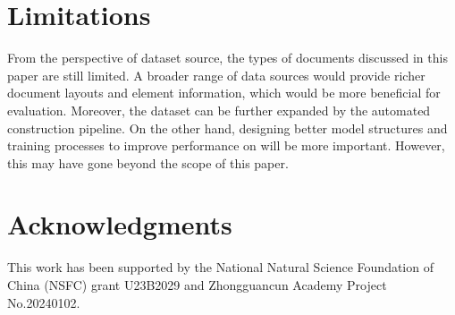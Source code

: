 \section*{Limitations}
From the perspective of dataset source, the types of documents discussed in this paper are still limited. A broader range of data sources would provide richer document layouts and element information, which would be more beneficial for evaluation. Moreover, the dataset can be further expanded by the automated construction pipeline. On the other hand, designing better model structures and training processes to improve performance on \benchName will be more important. However, this may have gone beyond the scope of this paper.

\section*{Acknowledgments}
This work has been supported by the National Natural Science Foundation of China (NSFC) grant U23B2029 and Zhongguancun Academy Project No.20240102.